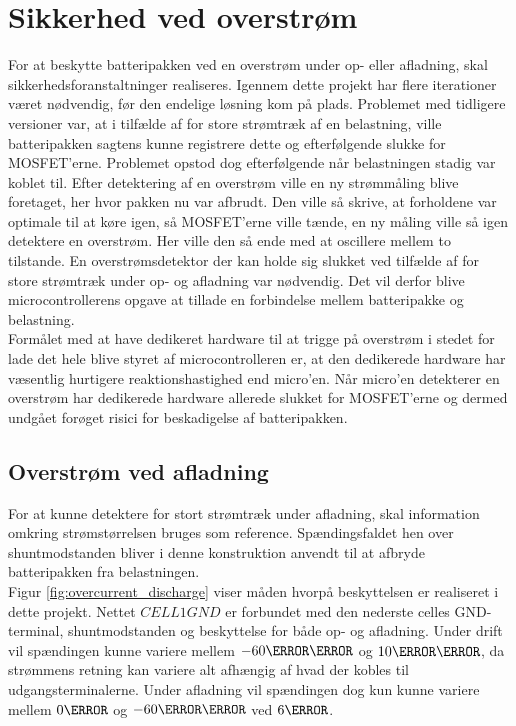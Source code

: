 \section{Sikkerhed ved overstrøm}
For at beskytte batteripakken ved en overstrøm under op- eller afladning, skal sikkerhedsforanstaltninger realiseres. Igennem dette projekt har flere iterationer været nødvendig, før den endelige løsning kom på plads. Problemet med tidligere versioner var, at i tilfælde af for store strømtræk af en belastning, ville batteripakken sagtens kunne registrere dette og efterfølgende slukke for MOSFET'erne. Problemet opstod dog efterfølgende når belastningen stadig var koblet til. Efter detektering af en overstrøm ville en ny strømmåling blive foretaget, her hvor pakken nu var afbrudt. Den ville så skrive, at forholdene var optimale til at køre igen, så MOSFET'erne ville tænde, en ny måling ville så igen detektere en overstrøm. Her ville den så ende med at oscillere mellem to tilstande. En overstrømsdetektor der kan holde sig slukket ved tilfælde af for store strømtræk under op- og afladning var nødvendig. Det vil derfor blive microcontrollerens opgave at tillade en forbindelse mellem batteripakke og belastning.
\\

Formålet med at have dedikeret hardware til at trigge på overstrøm i stedet for lade det hele blive styret af microcontrolleren er, at den dedikerede hardware har væsentlig hurtigere reaktionshastighed end micro'en. Når micro'en detekterer en overstrøm har dedikerede hardware allerede slukket for MOSFET'erne og dermed undgået forøget risici for beskadigelse af batteripakken.
\\

\subsection{Overstrøm ved afladning}
For at kunne detektere for stort strømtræk under afladning, skal information omkring strømstørrelsen bruges som reference. Spændingsfaldet hen over shuntmodstanden bliver i denne konstruktion anvendt til at afbryde batteripakken fra belastningen.
\\

Figur \ref{fig:overcurrent_discharge} viser måden hvorpå beskyttelsen er realiseret i dette projekt. Nettet $CELL1GND$ er forbundet med den nederste celles GND-terminal, shuntmodstanden og beskyttelse for både op- og afladning. Under drift vil spændingen kunne variere mellem $-60\milli\volt$ og $10\milli\volt$, da strømmens retning kan variere alt afhængig af hvad der kobles til udgangsterminalerne. Under afladning vil spændingen dog kun kunne variere mellem $0\volt$ og $-60\milli\volt$ ved $6\ampere$.
\\

